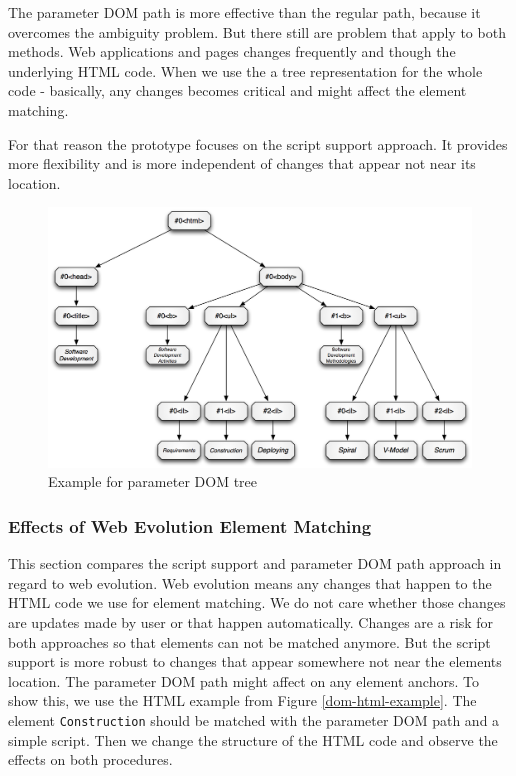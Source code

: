 The parameter DOM path is more effective than the regular path, because it overcomes the ambiguity problem. But there still are problem that apply to both methods. Web applications and pages changes frequently and though the underlying HTML code. When we use the a tree representation for the whole code - basically, any changes becomes critical and might affect the element matching. 

For that reason the prototype focuses on the script support approach. It provides more flexibility and is more independent of changes that appear not near its location. 

\begin{figure}\centering
		\includegraphics[width=13cm]{images/dom-paramaterized-tree-example.png}
		\caption{Example for parameter DOM tree}
		\label{dom-paramaterized-tree-example}
\end{figure} 

\subsubsection{Effects of Web Evolution Element Matching}

This section compares the script support and parameter DOM path approach in regard to web evolution. Web evolution means any changes that happen to the HTML code we use for element matching. We do
 not
 care whether those changes are updates made by user or that happen automatically. Changes are a risk for both approaches so that elements can not be matched anymore. But the script support is more robust to changes that appear somewhere not near the elements location. The parameter DOM path might affect on any element anchors.
To show this, we use the HTML example from Figure \ref{dom-html-example}. The element \verb^Construction^ should be matched with the parameter DOM path and a simple script. Then we change the structure of the HTML code and observe the effects on both procedures.

